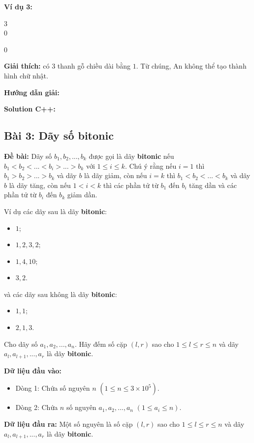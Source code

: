 \documentclass[12pt]{scrartcl}  %
\begin{document}
\textbf{Ví dụ 3:}
\begin{tcolorbox}[colback=gray!5!white, colframe=blue!50!black, title=Input]
3\\
0
\end{tcolorbox}
\begin{tcolorbox}[colback=gray!5!white, colframe=green!50!black, title=Output]
0
\end{tcolorbox}
\textbf{Giải thích:}
có $3$ thanh gỗ chiều dài bằng $1$. Từ chúng, An không thể tạo thành hình chữ nhật.

\textbf{Hướng dẫn giải:}

\textbf{Solution C++:}

\subsection{Bài 3: Dãy số bitonic}
\textbf{Đề bài:}
Dãy số $b_1, b_2, ... , b_k$ được gọi là dãy \textbf{bitonic} nếu $b_1 < b_2 < ... < b_i > ... > b_k$ với $1 \leq i \leq k$. Chú ý rằng nếu $i = 1$ thì $b_1 > b_2 > ... > b_k$ và dãy $b$ là dãy giảm, còn nếu $i = k$ thì $b_1 < b_2 < ... < b_k$ và dãy $b$ là dãy tăng, còn nếu $1 < i < k$ thì các phần tử từ $b_1$ đến $b_i$ tăng dần và các phần tử từ $b_i$ đến $b_k$ giảm dần.

Ví dụ các dãy sau là dãy \textbf{bitonic}:
\begin{itemize}
    \item $1$;
    \item $1, 2, 3, 2$;
    \item $1, 4, 10$;
    \item $3, 2$.
\end{itemize}
và các dãy sau không là dãy \textbf{bitonic}:
\begin{itemize}
    \item $1, 1$;
    \item $2, 1, 3$.
\end{itemize}
Cho dãy số $a_1, a_2, ... , a_n$. Hãy đếm số cặp $(l, r)$ sao cho $1 \leq l \leq r \leq n$ và dãy $a_l, a_{l + 1}, ..., a_r$ là dãy \textbf{bitonic}.

\textbf{Dữ liệu đầu vào:}
\begin{itemize}
    \item Dòng 1: Chứa số nguyên $n$ $(1 \leq n \leq 3 \times 10^5)$.
    \item Dòng 2: Chứa $n$ số nguyên $a_1, a_2, ..., a_n$ $(1 \leq a_i \leq n)$.
\end{itemize}

\textbf{Dữ liệu đầu ra:}
Một số nguyên là số cặp $(l, r)$ sao cho $1 \leq l \leq r \leq n$ và dãy $a_l, a_{l + 1}, ..., a_r$ là dãy \textbf{bitonic}.
\end{document}
